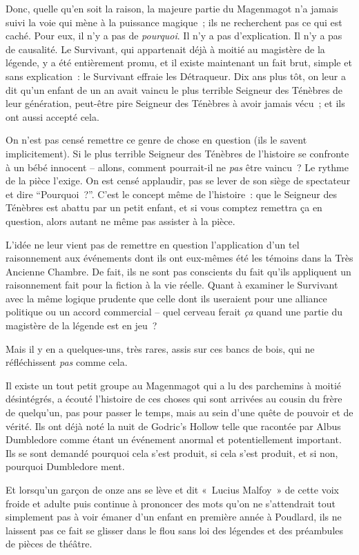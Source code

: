 Donc, quelle qu'en soit la raison, la majeure partie du Magenmagot n'a jamais suivi la voie qui mène à la puissance magique~; ils ne recherchent pas ce qui est caché.
Pour eux, il n'y a pas de \emph{pourquoi}.
Il n'y a pas d'explication.
Il n'y a pas de causalité.
Le Survivant, qui appartenait déjà à moitié au magistère de la légende, y a été entièrement promu, et il existe maintenant un fait brut, simple et sans explication~: le Survivant effraie les Détraqueur.
Dix ans plus tôt, on leur a dit qu'un enfant de un an avait vaincu le plus terrible Seigneur des Ténèbres de leur génération, peut-être pire Seigneur des Ténèbres à avoir jamais vécu~; et ils ont aussi accepté cela.

On n'est pas censé remettre ce genre de chose en question (ils le savent implicitement).
Si le plus terrible Seigneur des Ténèbres de l'histoire se confronte à un bébé innocent -- allons, comment pourrait-il ne \emph{pas} être vaincu~?
Le rythme de la pièce l'exige.
On est censé applaudir, pas se lever de son siège de spectateur et dire “Pourquoi~?”.
C'est le concept même de l'histoire~: que le Seigneur des Ténèbres est abattu par un petit enfant, et si vous comptez remettra ça en question, alors autant ne même pas assister à la pièce.

L'idée ne leur vient pas de remettre en question l'application d'un tel raisonnement aux événements dont ils ont eux-mêmes été les témoins dans la Très Ancienne Chambre.
De fait, ils ne sont pas conscients du fait qu'ils appliquent un raisonnement fait pour la fiction à la vie réelle.
Quant à examiner le Survivant avec la même logique prudente que celle dont ils useraient pour une alliance politique ou un accord commercial -- quel cerveau ferait \emph{ça} quand une partie du magistère de la légende est en jeu~?

Mais il y en a quelques-uns, très rares, assis sur ces bancs de bois, qui ne réfléchissent \emph{pas} comme cela.

Il existe un tout petit groupe au Magenmagot qui a lu des parchemins à moitié désintégrés, a écouté l'histoire de ces choses qui sont arrivées au cousin du frère de quelqu'un, pas pour passer le temps, mais au sein d'une quête de pouvoir et de vérité.
Ils ont déjà noté la nuit de Godric's Hollow telle que racontée par Albus Dumbledore comme étant un événement anormal et potentiellement important.
Ils se sont demandé pourquoi cela s'est produit, si cela s'est produit, et si non, pourquoi Dumbledore ment.

Et lorsqu'un garçon de onze ans se lève et dit «~Lucius Malfoy~» de cette voix froide et adulte puis continue à prononcer des mots qu'on ne s'attendrait tout simplement pas à voir émaner d'un enfant en première année à Poudlard, ils ne laissent pas ce fait se glisser dans le flou sans loi des légendes et des préambules de pièces de théâtre.

